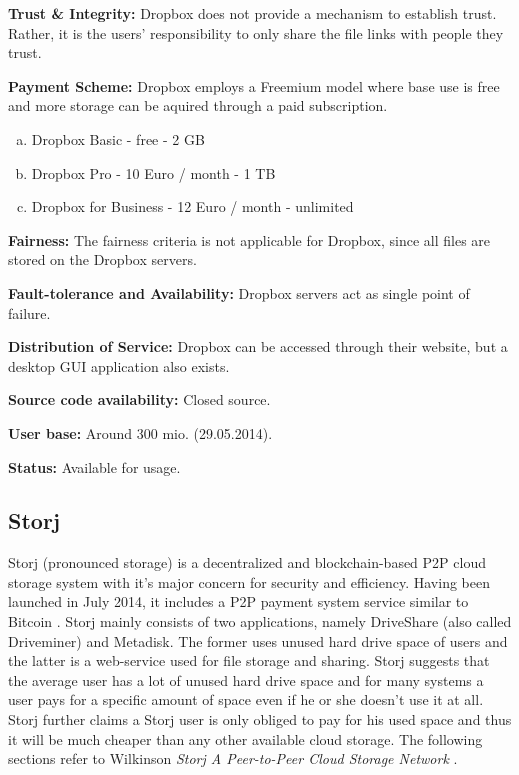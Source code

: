 \textbf{Trust \& Integrity:} Dropbox does not provide a mechanism to establish trust. Rather, it is the users' responsibility to only share the file links with people they trust.

\textbf{Payment Scheme:} Dropbox employs a Freemium model where base use is free and more storage can be aquired through a paid subscription.
\begin{enumerate}[(a)]
	\item Dropbox Basic - free - 2 GB
	\item Dropbox Pro - 10 Euro / month - 1 TB
	\item Dropbox for Business - 12 Euro / month - unlimited
\end{enumerate}

\textbf{Fairness:} The fairness criteria is not applicable for Dropbox, since all files are stored on the Dropbox servers.

\textbf{Fault-tolerance and Availability:} Dropbox servers act as single point of failure.

\textbf{Distribution of Service:} Dropbox can be accessed through their website, but a desktop GUI application also exists.

\textbf{Source code availability:} Closed source.

\textbf{User base:} Around 300 mio. (29.05.2014)\cite{dropbox:userbase}.

\textbf{Status:} Available for usage.

\subsection{Storj}
\label{subsec:storj}
Storj (pronounced storage) is a decentralized and blockchain-based P2P cloud storage system with it's major concern for security and efficiency. Having been launched in July 2014, it includes a P2P payment system service similar to Bitcoin \cite{storj:blog:what_is_storj}. Storj mainly consists of two applications, namely DriveShare (also called Driveminer) and Metadisk. The former uses unused hard drive space of users and the latter is a web-service used for file storage and sharing. Storj suggests that the average user has a lot of unused hard drive space and for many systems a user pays for a specific amount of space even if he or she doesn't use it at all. Storj further claims a Storj user is only obliged to pay for his used space and thus it will be much cheaper than any other available cloud storage. The following sections refer to Wilkinson \textit{Storj A Peer-to-Peer Cloud Storage Network} \cite{storj:PDF}.

